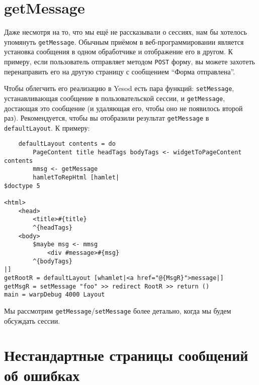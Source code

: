 \section {getMessage}

Даже несмотря на то, что мы ещё не рассказывали о сессиях, нам бы хотелось упомянуть \lstinline!getMessage!. Обычным приёмом в веб-программировании является установка сообщения в одном обработчике и отображение его в другом. К примеру, если пользователь отправляет методом \lstinline!POST! форму, вы можете захотеть перенаправить его на другую страницу с сообщением ``Форма отправлена''.



Чтобы облегчить его реализацию в Yesod  есть пара функций: \lstinline!setMessage!, устанавливающая сообщение в пользовательской сессии, и \lstinline!getMessage!, достающая это сообщение (и удаляющая его, чтобы оно не появилось второй раз). Рекомендуется, чтобы вы отобразили результат \lstinline!getMessage! в \lstinline!defaultLayout!. К примеру:

\begin{lstlisting}
    defaultLayout contents = do
        PageContent title headTags bodyTags <- widgetToPageContent contents
        mmsg <- getMessage
        hamletToRepHtml [hamlet|
$doctype 5

<html>
    <head>
        <title>#{title}
        ^{headTags}
    <body>
        $maybe msg <- mmsg
            <div #message>#{msg}
        ^{bodyTags}
|]
getRootR = defaultLayout [whamlet|<a href="@{MsgR}">message|]
getMsgR = setMessage "foo" >> redirect RootR >> return ()
main = warpDebug 4000 Layout
\end{lstlisting}%

Мы рассмотрим \lstinline!getMessage!/\lstinline!setMessage! более детально, когда мы будем обсуждать сессии.

\section {Нестандартные страницы сообщений об ошибках}

